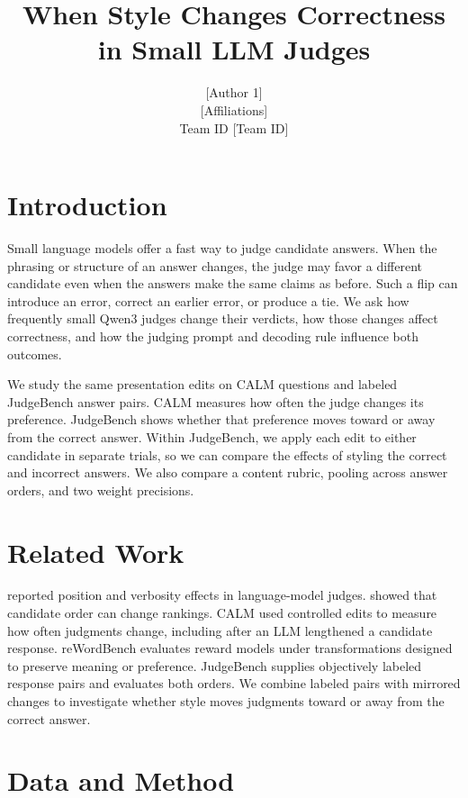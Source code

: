 \documentclass[11pt]{article}
\title{When Style Changes Correctness in Small LLM Judges}
\author{[Author 1] \quad [Author 2] \quad [Author 3] \quad [Author 4] \\
        {[Affiliations]} \\
        Team ID [Team ID]}
\begin{document}
\maketitle

\begin{abstract}

\end{abstract}

\section{Introduction}
Small language models offer a fast way to judge candidate answers. When
the phrasing or structure of an answer changes, the judge may favor a
different candidate even when the answers make the same claims as before.
Such a flip can introduce an error, correct an earlier error, or produce
a tie. We ask how frequently small Qwen3 judges change their verdicts,
how those changes affect correctness, and how the judging prompt and
decoding rule influence both outcomes.

We study the same presentation edits on \CalmPairs{} CALM questions
and \GoldPairs{} labeled JudgeBench answer pairs. CALM measures how
often the judge changes its preference. JudgeBench shows whether that
preference moves toward or away from the correct answer. Within
JudgeBench, we apply each edit to either candidate in separate trials,
so we can compare the effects of styling the correct and incorrect
answers. We also compare a content rubric, pooling across answer orders,
and two weight precisions.

\section{Related Work}
\citet{zheng2023mtbench} reported position and verbosity effects in
language-model judges. \citet{wang2024fair} showed that candidate order
can change rankings. CALM \citep{ye2025calm} used controlled edits to
measure how often judgments change, including after an LLM lengthened
a candidate response. reWordBench \citep{wu2025rewordbench} evaluates
reward models under transformations designed to preserve meaning or
preference. JudgeBench \citep{tan2025judgebench} supplies objectively
labeled response pairs and evaluates both orders. We combine labeled
pairs with mirrored changes to investigate whether style moves judgments
toward or away from the correct answer.

\section{Data and Method}
\end{document}
